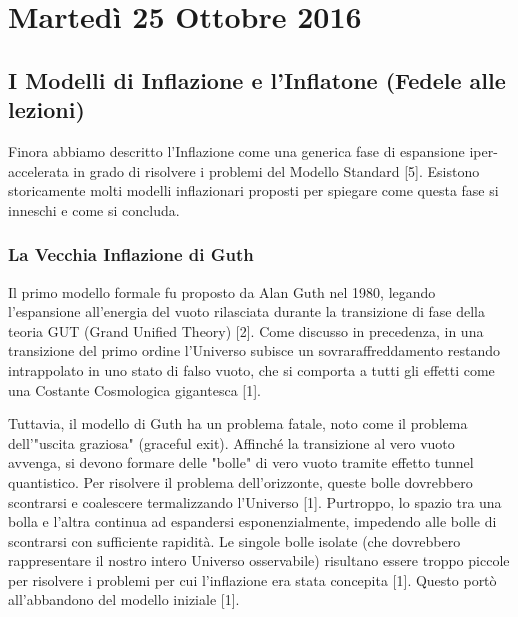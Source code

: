 \documentclass[11pt,a4paper]{report}
\begin{document}
\chapter{Martedì 25 Ottobre 2016}

\section{I Modelli di Inflazione e l'Inflatone (Fedele alle lezioni)}

Finora abbiamo descritto l'Inflazione come una generica fase di espansione iper-accelerata in grado di risolvere i problemi del Modello Standard [5]. Esistono storicamente molti modelli inflazionari proposti per spiegare come questa fase si inneschi e come si concluda.

\subsection{La Vecchia Inflazione di Guth}
Il primo modello formale fu proposto da Alan Guth nel 1980, legando l'espansione all'energia del vuoto rilasciata durante la transizione di fase della teoria GUT (Grand Unified Theory) [2]. Come discusso in precedenza, in una transizione del primo ordine l'Universo subisce un sovraraffreddamento restando intrappolato in uno stato di falso vuoto, che si comporta a tutti gli effetti come una Costante Cosmologica gigantesca [1]. 

Tuttavia, il modello di Guth ha un problema fatale, noto come il problema dell'"uscita graziosa" (graceful exit). Affinché la transizione al vero vuoto avvenga, si devono formare delle "bolle" di vero vuoto tramite effetto tunnel quantistico. Per risolvere il problema dell'orizzonte, queste bolle dovrebbero scontrarsi e coalescere termalizzando l'Universo [1]. Purtroppo, lo spazio tra una bolla e l'altra continua ad espandersi esponenzialmente, impedendo alle bolle di scontrarsi con sufficiente rapidità. Le singole bolle isolate (che dovrebbero rappresentare il nostro intero Universo osservabile) risultano essere troppo piccole per risolvere i problemi per cui l'inflazione era stata concepita [1]. Questo portò all'abbandono del modello iniziale [1].
\end{document}
